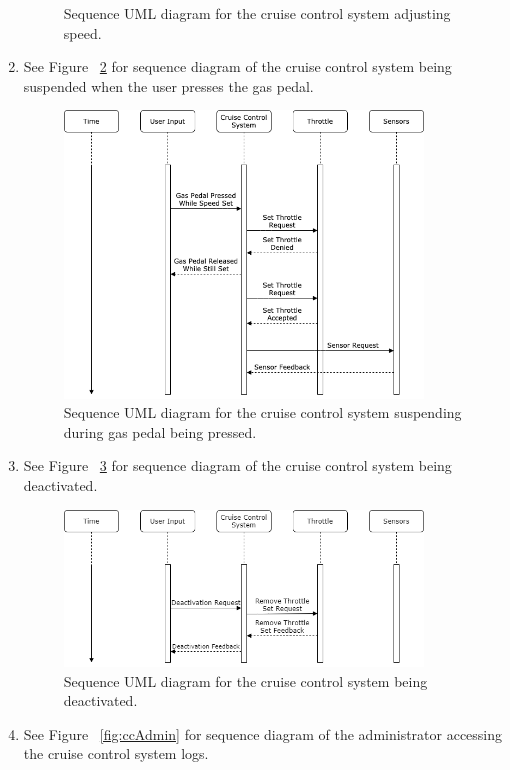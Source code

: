 \documentclass[preprint,11pt,3p]{article}
\begin{document}
\begin{enumerate}
\begin{figure}[H]
			\caption{Sequence UML diagram for the cruise control system adjusting speed.}
			\label{fig:ccAdjust}
		\end{figure}
	\item See Figure ~\ref{fig:ccGas} for sequence diagram of the cruise control system being suspended when the user presses the gas pedal.
		\begin{figure}[H]
			\includegraphics[width=0.9\textwidth]{images/gasPedalPressedSequence.png}
			\caption{Sequence UML diagram for the cruise control system suspending during gas pedal being pressed.}
			\label{fig:ccGas}
		\end{figure}
	\item See Figure ~\ref{fig:ccDeactivate} for sequence diagram of the cruise control system being deactivated.
		\begin{figure}[H]
			\includegraphics[width=0.9\textwidth]{images/deactivation.png}
			\caption{Sequence UML diagram for the cruise control system being deactivated.}
			\label{fig:ccDeactivate}
		\end{figure}
	\item See Figure ~\ref{fig:ccAdmin} for sequence diagram of the administrator accessing the cruise control system logs.

\end{enumerate}
\end{document}
